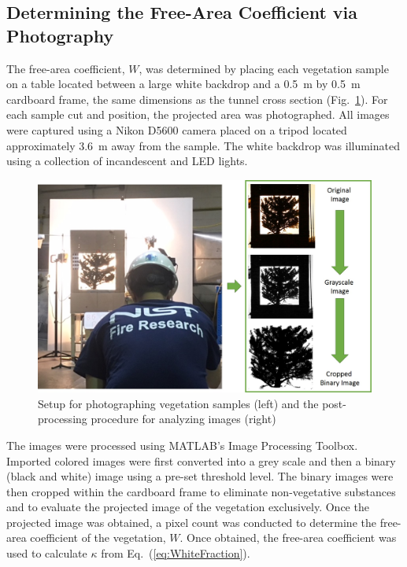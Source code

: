 \documentclass[12pt]{article}
\begin{document}
\subsection{Determining the Free-Area Coefficient via Photography}
\label{ssec:Free-Area Coef. Photo}

The free-area coefficient, $W$, was determined by placing each vegetation sample on a table located between a large white backdrop and a 0.5~m by 0.5~m cardboard frame, the same dimensions as the tunnel cross section (Fig.~\ref{fig:ImgAnaly}). For each sample cut and position, the projected area was photographed. All images were captured using a Nikon D5600 camera placed on a tripod located approximately 3.6~\si{m} away from the sample. The white backdrop was illuminated using a collection of incandescent and LED lights.

\begin{figure} [!h]
	\centering 	\includegraphics[width=1.0\linewidth]{Picture5.jpg}
	\caption[Setup for photographing vegetation samples]{Setup for photographing vegetation samples (left) and the post-processing procedure for analyzing images (right)}
	\label{fig:ImgAnaly}
\end{figure}

The images were processed using MATLAB's Image Processing Toolbox. Imported colored images were first converted into a grey scale and then a binary (black and white) image using a pre-set threshold level. The binary images were then cropped within the cardboard frame to eliminate non-vegetative substances and to evaluate the projected image of the vegetation exclusively. Once the projected image was obtained, a pixel count was conducted to determine the free-area coefficient of the vegetation, $W$. Once obtained, the free-area coefficient was used to calculate $\kappa$ from Eq.~(\ref{eq:WhiteFraction}).
\end{document}
